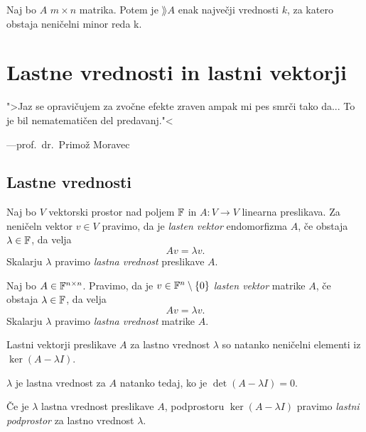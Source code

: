 \documentclass[12pt, a4paper]{article}
\begin{document}
\obvs

\begin{izrek}
Naj bo $A$ $m\times n$ matrika. Potem je $\rang A$ enak največji vrednosti $k$, za katero obstaja neničelni minor reda k.
\end{izrek}

\obvs

\newpage

\section{Lastne vrednosti in lastni vektorji}

\epigraph{">Jaz se opravičujem za zvočne efekte zraven ampak mi pes smrči tako da... To je bil nematematičen del predavanj."<}{---prof.~dr.~Primož Moravec}

\subsection{Lastne vrednosti}

\begin{okvir}
\begin{definicija}
Naj bo $V$ vektorski prostor nad poljem $\mathbb{F}$ in $A\colon V\to V$ linearna preslikava. Za neničeln vektor $v\in V$ pravimo, da je \emph{lasten vektor} endomorfizma $A$, če obstaja $\lambda\in\mathbb{F}$, da velja
\[
Av=\lambda v.
\]
Skalarju $\lambda$ pravimo \emph{lastna vrednost} preslikave $A$.
\end{definicija}
\begin{definicija}
Naj bo $A\in\mathbb{F}^{n\times n}$. Pravimo, da je $v\in\mathbb{F}^n\setminus\left\{0\right\}$ \emph{lasten vektor} matrike $A$, če obstaja $\lambda\in\mathbb{F}$, da velja
\[
Av=\lambda v.
\]
Skalarju $\lambda$ pravimo \emph{lastna vrednost} matrike $A$.
\end{definicija}
\end{okvir}

\begin{trditev}
Lastni vektorji preslikave $A$ za lastno vrednost $\lambda$ so natanko neničelni elementi iz $\ker(A-\lambda I)$.
\end{trditev}

\obvs

\begin{posledica}
$\lambda$ je lastna vrednost za $A$ natanko tedaj, ko je $\det(A-\lambda I)=0$.
\end{posledica}

\begin{definicija}
Če je $\lambda$ lastna vrednost preslikave $A$, podprostoru $\ker(A-\lambda I)$ pravimo \emph{lastni podprostor} za lastno vrednost $\lambda$.
\end{definicija}
\end{document}
